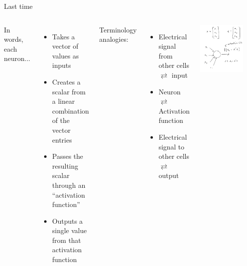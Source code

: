 \documentclass[mathserif, aspectratio=169]{beamer}
\begin{document}
\begin{frame}{Last time}
    \begin{columns}
    		In words, each neuron...
    		\begin{itemize}
    			\item Takes a vector of values as inputs
    			\item Creates a scalar from a linear combination of the vector entries
    			\item Passes the resulting scalar through an ``activation function''
    			\item Outputs a single value from that activation function
    		\end{itemize}

    		Terminology analogies:
    		\begin{itemize}
    			\item Electrical signal from other cells $\rightleftarrows$ input
    			\item Neuron $\rightleftarrows$ Activation function
    			\item Electrical signal to other cells $\rightleftarrows$ output
    		\end{itemize}
    	\pause
    	\includegraphics[width=0.85\textwidth]{neuron_math.pdf}
	    	
    \end{columns}

\end{frame}
\end{document}
